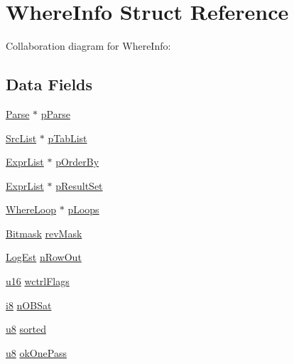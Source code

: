 \hypertarget{struct_where_info}{}\section{Where\+Info Struct Reference}
\label{struct_where_info}


Collaboration diagram for Where\+Info\+:
\subsection*{Data Fields}
\begin{DoxyCompactItemize}
\item 
\hyperlink{struct_parse}{Parse} $\ast$ \hyperlink{struct_where_info_ac700bf257b32cd7e491fde90a081379d}{p\+Parse}
\item 
\hyperlink{struct_src_list}{Src\+List} $\ast$ \hyperlink{struct_where_info_a1674d2e1df2aef30ab34fca8ba9fadf2}{p\+Tab\+List}
\item 
\hyperlink{struct_expr_list}{Expr\+List} $\ast$ \hyperlink{struct_where_info_a9150e506e5902e336130c9764caf96a0}{p\+Order\+By}
\item 
\hyperlink{struct_expr_list}{Expr\+List} $\ast$ \hyperlink{struct_where_info_a0b2d06815787b3b4fcded5087620da78}{p\+Result\+Set}
\item 
\hyperlink{struct_where_loop}{Where\+Loop} $\ast$ \hyperlink{struct_where_info_a5dc3b6e81d69f5436019b6cc3746e068}{p\+Loops}
\item 
\hyperlink{sqlite3_8c_afa77b629897c4457bfdc47d364ba5c3f}{Bitmask} \hyperlink{struct_where_info_ab8ca9736ce631551a49e193b3bfbc8dc}{rev\+Mask}
\item 
\hyperlink{sqlite3_8c_aa0f9b3b63ad120ac15b96785b05ce733}{Log\+Est} \hyperlink{struct_where_info_a6fd57be53ea38aadf6e9ace68b69e5f4}{n\+Row\+Out}
\item 
\hyperlink{sqlite3_8c_a20f2299e322dcbde37cb07b16910b843}{u16} \hyperlink{struct_where_info_a199111eb285cee7d61eacce4ff5e5555}{wctrl\+Flags}
\item 
\hyperlink{sqlite3_8c_ad11a1324ecade336dc6ce17a20cf6617}{i8} \hyperlink{struct_where_info_ae422b7c9e7d9f1952c700fa9cfd819cb}{n\+O\+B\+Sat}
\item 
\hyperlink{sqlite3_8c_a74a0f6424ae628af25f23f0a35f6ead3}{u8} \hyperlink{struct_where_info_ad4c414c8a8cc2a3daa12a1d54f54bbbf}{sorted}
\item 
\hyperlink{sqlite3_8c_a74a0f6424ae628af25f23f0a35f6ead3}{u8} \hyperlink{struct_where_info_a79b229978a938c5d68d5088122298771}{ok\+One\+Pass}

\end{DoxyCompactItemize}
